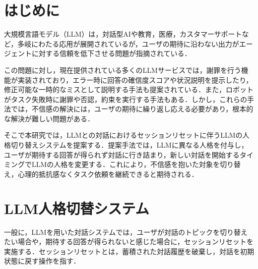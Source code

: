 \documentclass[a4paper,10pt,twocolumn]{myjarticle2}
\begin{document}
\section{はじめに}
大規模言語モデル（LLM）は，対話型AIや教育，医療，カスタマーサポートなど，多岐にわたる応用が展開されているが，ユーザの期待に沿わない出力がエージェントに対する信頼を低下させる問題が指摘されている\cite{Kim2024}．

この問題に対し，現在提供されている多くのLLMサービスでは，謝罪を行う機能が実装されており，エラー時に回答の確信度スコアや状況説明を提示したり，修正可能な一時的なミスとして説明する手法も提案されている\cite{Martell2025}．また，ロボットがタスク失敗時に謝罪や否認，約束を実行する手法\cite{Esterwood2023}もある．しかし，これらの手法では，不信感の解決には，ユーザの期待に繰り返し応える必要があり，根本的な解決が難しい問題がある．



そこで本研究では，LLMとの対話におけるセッションリセットに伴うLLMの人格切り替えシステムを提案する．提案手法では，LLMに異なる人格を付与し，ユーザが期待する回答が得られず対話に行き詰まり，新しい対話を開始するタイミングでLLMの人格を変更する．これにより，不信感を抱いた対象を切り替え，心理的抵抗感なくタスク依頼を継続できると期待される．

\section{LLM人格切替システム}
一般に，LLMを用いた対話システムでは，ユーザが対話のトピックを切り替えたい場合や，期待する回答が得られないと感じた場合に，セッションリセットを実施する．セッションリセットとは，蓄積された対話履歴を破棄し，対話を初期状態に戻す操作を指す．
\end{document}
